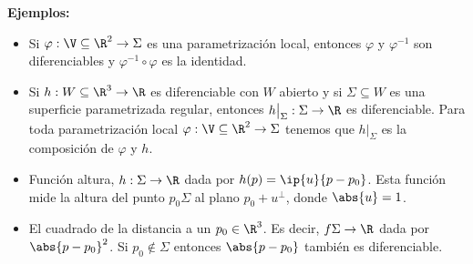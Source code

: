 \documentclass{article}
\begin{document}
\noindent\textbf{Ejemplos:}
\begin{itemize}
    \item Si $\varphi:\V\subseteq\R^{2}\to\Sigma$ es una parametrización local, entonces 
    $\varphi$ y $\varphi^{-1}$ son diferenciables y $\varphi^{-1}\circ\varphi$ es la identidad.

    \item Si $h:W\subseteq\R^{3}\to\R$ es diferenciable con $W$ abierto y si $\Sigma\subseteq W$
    es una superficie parametrizada regular, entonces $h\big|_{\Sigma}:\Sigma\to\R$ es 
    diferenciable. Para toda parametrización local $\varphi:\V\subseteq\R^{2}\to\Sigma$ tenemos que
    $h\big|_{\Sigma}$ es la composición de $\varphi$ y $h$.

    \item Función altura, $h:\Sigma\to\R$ dada por $h(p)=\ip{u}{p-p_{0}}$. Esta función mide la 
    altura del punto $p_{0}\Sigma$ al plano $p_{0}+u^{\perp}$, donde $\abs{u}=1$.
    
    \item El cuadrado de la distancia a un $p_{0}\in\R^{3}$. Es decir, $f\Sigma\to\R$ dada por
    $\abs{p-p_{0}}^{2}$. Si $p_{0}\not\in\Sigma$ entonces $\abs{p-p_{0}}$ también es diferenciable.
\end{itemize}

\end{document}
